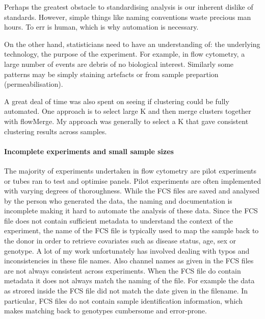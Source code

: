 Perhaps the greatest obstacle to standardising analysis is our inherent dislike of standards.
However, simple things like naming conventions waste precious man hours.
To err is human,  which is why automation is necessary.

On the other hand, statisticians need to have an understanding of: the underlying technology, the purpose of the experiment.
For example, in flow cytometry, a large number of events are debris of no biological interest.
Similarly some patterns may be simply staining artefacts or from sample prepartion (permeabilisation).

A great deal of time was also spent on seeing if clustering could be fully automated. 
One approach is to select large K and then merge clusters together with flowMerge.
My approach was generally to select a K that gave consistent clustering results across samples.



\paragraph{ Incomplete experiments and small sample sizes}

The majority of experiments undertaken in flow cytometry are 
pilot experiments or tubes ran to test and optimise panels.
Pilot experiments
are often implemented with varying degrees of thoroughness.
While the FCS files are saved and analysed by the person who generated the data, the naming and documentation is incomplete
making it hard to automate the analysis of these data.
Since the FCS file does not contain sufficient metadata to understand the context of the experiment, the name of the FCS
file is typically used to map the sample back to the donor in order to retrieve covariates such as disease status, age, sex or genotype.
A lot of my work unfortunately has involved dealing with typos and inconsistencies in these file names.
Also channel names as given in the FCS files are not always consistent across experiments.
When the FCS file do contain metadata it does not always match the naming of the file.
For example the data as strored inside the FCS file did not match the date given in the filename.
In particular, FCS files do not contain sample identification information, which makes matching back to genotypes cumbersome and error-prone.

